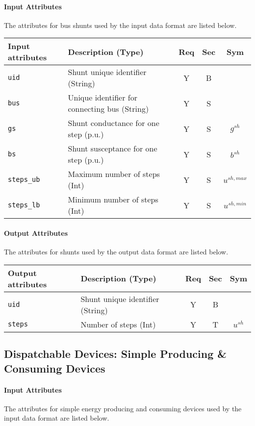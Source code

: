 \documentclass{article}
\begin{document}
\paragraph{Input Attributes} The attributes for bus shunts used by the input data format are listed below.
\begin{center}
\small

\begin{tabular}{ l | l | c | c | c | }
Input attributes & Description (Type) & Req & Sec & Sym\\
\hline
  {\tt uid} & Shunt unique identifier (String) & Y & B &  \\
  {\tt bus} & Unique identifier for connecting bus (String)& Y & S &  \\
  {\tt gs}  & Shunt conductance for one step (p.u.) & Y & S & $g^{sh}$ \\
  {\tt bs}  & Shunt susceptance for one step (p.u.) & Y & S & $b^{sh}$ \\
  {\tt steps\_ub}      & Maximum number of steps (Int)  & Y & S & $u^{sh,max}$\\
  {\tt steps\_lb}      & Minimum number of steps (Int)  & Y & S & $u^{sh,min}$\\
\hline
\end{tabular}
\end{center}

\paragraph{Output Attributes} The attributes for shunts used by the output data format are listed below.

\begin{center}
\small
\begin{tabular}{ l | l | c | c | c |}
Output attributes & Description (Type) & Req & Sec & Sym\\
\hline
  {\tt uid} & Shunt unique identifier (String) & Y & B & \\
  {\tt steps}      & Number of steps (Int)  & Y  & T &$u^{sh}$\\
\hline
\end{tabular}
\end{center}


\subsection{Dispatchable Devices: Simple Producing \& Consuming Devices}
\label{nom:gen_single}
\paragraph{Input Attributes} The attributes for
simple energy producing and consuming devices used by the input data format are listed below.
\end{document}
